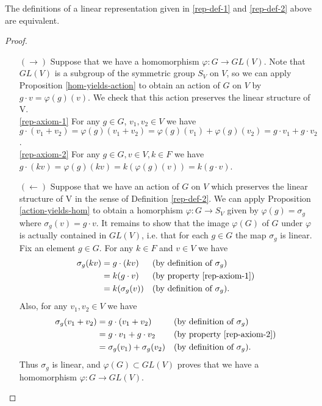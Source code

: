  \begin{prop}
The definitions of a linear representation given in \ref{rep-def-1} and \ref{rep-def-2} above are equivalent.
 \end{prop}
 \begin{proof}
 \begin{itemize}
\item[$(\rightarrow)$]  Suppose that we have a homomorphism $\varphi \colon G \to GL(V)$.  Note that $GL(V)$ is a subgroup of the symmetric group $S_V$ on $V$, so we can apply Proposition \ref{hom-yields-action} to obtain an action of $G$ on $V$ by $g \cdot v = \varphi(g)(v)$.  We check that this action preserves the linear structure of V.
\\\ref{rep-axiom-1} \quad For any $g \in G$, $v_1, v_2 \in V$ we have $g \cdot (v_1 +  v_2) = \varphi(g) (v_1 + v_2) = \varphi(g)(v_1) + \varphi(g)(v_2)= g \cdot v_1 + g \cdot v_2$.
\\\ref{rep-axiom-2} \quad For any $g \in G, v \in V, k \in F$ we have $g \cdot (kv) = \varphi(g)(kv) = k (\varphi(g)(v)) = k (g \cdot v)$.
\item[$(\leftarrow)$] Suppose that we have an action of $G$ on $V$ which preserves the linear structure of V in the sense of Definition \ref{rep-def-2}.  We can apply Proposition \ref{action-yields-hom} to obtain a homorphism $\varphi \colon G \to S_V$ given by $\varphi(g) = \sigma_g$ where $\sigma_g(v) = g \cdot v $.  It remains to show that the image $\varphi(G)$ of $G$ under $\varphi$ is actually contained in $GL(V)$, i.e. that for each $g \in G$ the map $\sigma_g$ is linear.  Fix an element $g \in G$. For any $k \in F$ and $v \in V$ we have
\begin{align*}
\sigma_g (kv) &= g \cdot (kv) && \text{(by definition of $\sigma_g$)} \\
		&= k (g \cdot v) && \text{(by property \ref{rep-axiom-1})} \\
		&= k (\sigma_g (v)) && \text{(by definition of $\sigma_g$)}.
\end{align*}
Also, for any $v_1, v_2 \in V$ we have
\begin{align*}
\sigma_g (v_1 + v_2) &= g \cdot (v_1 + v_2) && \text{(by definition of $\sigma_g$)} \\
		&= g \cdot v_1 + g \cdot v_2 && \text{(by property \ref{rep-axiom-2})} \\
		&= \sigma_g(v_1) + \sigma_g(v_2) && \text{(by definition of $\sigma_g$)}.
\end{align*}
Thus $\sigma_g$ is linear, and $\varphi(G) \subset GL(V)$ proves that we  have a homomorphism $\varphi \colon G \to GL(V)$.

\end{itemize}
 \end{proof}
